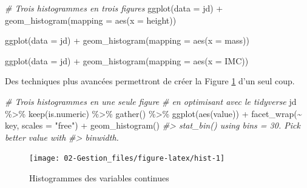 \documentclass[
]{book}
\newenvironment{Shaded}{}{}
\newcommand{\AttributeTok}[1]{#1}
\newcommand{\CommentTok}[1]{\textit{#1}}
\newcommand{\FunctionTok}[1]{#1}
\newcommand{\NormalTok}[1]{#1}
\newcommand{\SpecialCharTok}[1]{#1}
\newcommand{\StringTok}[1]{#1}
\begin{document}
\begin{Shaded}
\begin{Highlighting}[]
\CommentTok{\# Trois histogrammes en trois figures}
\FunctionTok{ggplot}\NormalTok{(}\AttributeTok{data =}\NormalTok{ jd) }\SpecialCharTok{+} 
  \FunctionTok{geom\_histogram}\NormalTok{(}\AttributeTok{mapping =} \FunctionTok{aes}\NormalTok{(}\AttributeTok{x =}\NormalTok{ height))}

\FunctionTok{ggplot}\NormalTok{(}\AttributeTok{data =}\NormalTok{ jd) }\SpecialCharTok{+} 
  \FunctionTok{geom\_histogram}\NormalTok{(}\AttributeTok{mapping =} \FunctionTok{aes}\NormalTok{(}\AttributeTok{x =}\NormalTok{ mass))}

\FunctionTok{ggplot}\NormalTok{(}\AttributeTok{data =}\NormalTok{ jd) }\SpecialCharTok{+} 
  \FunctionTok{geom\_histogram}\NormalTok{(}\AttributeTok{mapping =} \FunctionTok{aes}\NormalTok{(}\AttributeTok{x =}\NormalTok{ IMC))}
\end{Highlighting}
\end{Shaded}

Des techniques plus avancées permettront de créer la Figure \ref{fig:hist} d'un seul coup.

\begin{Shaded}
\begin{Highlighting}[]
\CommentTok{\# Trois histogrammes en une seule figure}
\CommentTok{\# en optimisant avec le tidyverse}
\NormalTok{jd }\SpecialCharTok{\%\textgreater{}\%}
  \FunctionTok{keep}\NormalTok{(is.numeric) }\SpecialCharTok{\%\textgreater{}\%} 
  \FunctionTok{gather}\NormalTok{() }\SpecialCharTok{\%\textgreater{}\%} 
  \FunctionTok{ggplot}\NormalTok{(}\FunctionTok{aes}\NormalTok{(value)) }\SpecialCharTok{+}
  \FunctionTok{facet\_wrap}\NormalTok{(}\SpecialCharTok{\textasciitilde{}}\NormalTok{ key, }\AttributeTok{scales =} \StringTok{"free"}\NormalTok{) }\SpecialCharTok{+}
  \FunctionTok{geom\_histogram}\NormalTok{()}
\CommentTok{\#\textgreater{} \textasciigrave{}stat\_bin()\textasciigrave{} using \textasciigrave{}bins = 30\textasciigrave{}. Pick better value with}
\CommentTok{\#\textgreater{} \textasciigrave{}binwidth\textasciigrave{}.}
\end{Highlighting}
\end{Shaded}

\begin{figure}

{\centering \texttt{[image: 02-Gestion\_files/figure-latex/hist-1]} 

}

\caption{Histogrammes des variables continues}\label{fig:hist}
\end{figure}
\end{document}
